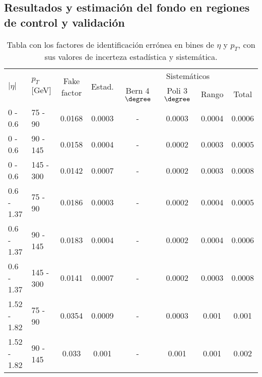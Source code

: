 \subsection{Resultados y estimación del fondo en regiones de control y validación} \label{sec:resultados}

\begin{table}	
\centering
\begin{threeparttable}
\caption{Tabla con los factores de identificación errónea en bines de $\eta$ y $p_{T}$, con sus valores de incerteza estadística y sistemática.}
\begin{tabular}{ l l c c c c c c }

	\hline
	\hline

	\multirow{2}{*}{$|\eta|$} & \multirow{2}{*}{$p_{T}$[GeV]} & \multirow{2}{*}{Fake factor} & \multirow{2}{*}{Estad.} & \multicolumn{4}{c}{Sistemáticos} \\

	\cline{5-8}

	 & & & & Bern 4$\degree$ & Poli 3$\degree$ & Rango & Total \\


	\hline

	0 - 0.6 & 75 - 90 & 0.0168 & 0.0003 & -			& 0.0003  &  0.0004 &  0.0006  \\

	0 - 0.6 & 90 - 145 & 0.0158 & 0.0004 & - 		& 0.0002  &  0.0003 &  0.0005  \\

	0 - 0.6 & 145 - 300 & 0.0142 & 0.0007 & -  		& 0.0002  &  0.0003 &  0.0008  \\

	\hline

	0.6 - 1.37 & 75 - 90 & 0.0186 & 0.0003 & -		& 0.0002  &  0.0004 &  0.0005  \\

	0.6 - 1.37 & 90 - 145 & 0.0183 & 0.0004 & -		& 0.0002  &  0.0004 &  0.0006  \\

	0.6 - 1.37 & 145 - 300 & 0.0141 & 0.0007 & -  	& 0.0002  &  0.0003 &  0.0008  \\

	\hline

	1.52 - 1.82 & 75 - 90 & 0.0354  & 0.0009 & -		& 0.0003  &  0.001 &  0.001  \\

	1.52 - 1.82 & 90 - 145 & 0.033  & 0.001 & -		& 0.001  &  0.001  &  0.002 \\


\end{tabular}
\end{threeparttable}
\end{table}
